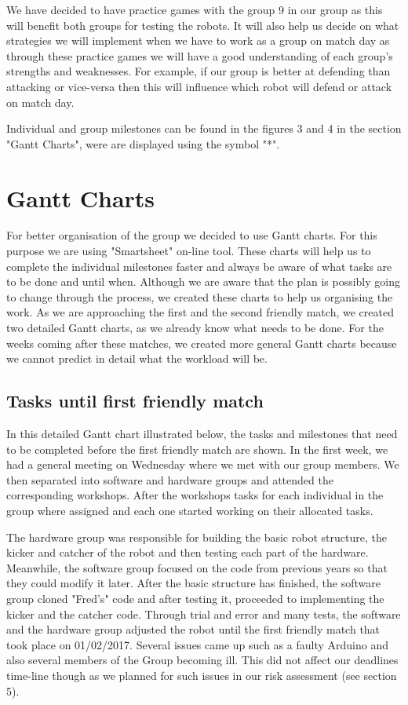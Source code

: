\documentclass{article}
\begin{document}
We have decided to have practice games with the group 9 in our group as this will benefit both groups for testing the robots. It will also help us decide on what strategies we will implement when we have to work as a group on match day as through these practice games we will have a good understanding of each group's strengths and weaknesses. For example, if our group is better at defending than attacking or vice-versa then this will influence which robot will defend or attack on match day.

Individual and group milestones can be found in the figures 3 and 4 in the section "Gantt Charts", were are displayed using the symbol "*".

\section{Gantt Charts}
For better organisation of the group we decided to use Gantt charts. For this purpose we are using "Smartsheet" on-line tool. These charts will help us to complete the individual milestones faster and always be aware of what tasks are to be done and until when. Although we are aware that the plan is possibly going to change through the process, we created these charts to help us organising the work. As we are approaching the first and the second friendly match, we created two detailed Gantt charts, as we already know what needs to be done. For the weeks coming after these matches, we created more general Gantt charts because we cannot predict in detail what the workload will be. 


\subsection{Tasks until first friendly match}
In this detailed Gantt chart illustrated below, the tasks and milestones that need to be completed before the first friendly match are shown. In the first week, we had a general meeting on Wednesday where we met with our group members. We then separated into software and hardware groups and attended the corresponding workshops. After the workshops tasks for each individual in the group where assigned and each one started working on their allocated tasks.


The hardware group was responsible for building the basic robot structure, the kicker and catcher of the robot and then testing each part of the hardware. Meanwhile, the software group focused on the code from previous years so that they could modify it later. After the basic structure has finished, the software group cloned "Fred's" code and after testing it, proceeded to implementing the kicker and the catcher code. Through trial and error and many tests, the software and the hardware group adjusted the robot until the first friendly match that took place on 01/02/2017. Several issues came up such as a faulty Arduino and also several members of the Group becoming ill. This did not affect our deadlines time-line though as we planned for such issues in our risk assessment (see section 5).
\end{document}
